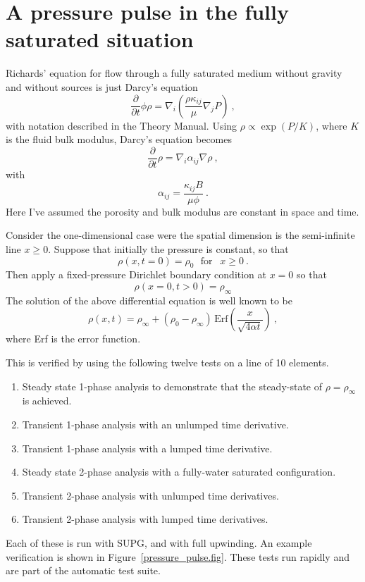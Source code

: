 \documentclass[]{scrreprt}
\begin{document}
\chapter{A pressure pulse in the fully saturated situation}
\label{pp}

Richards' equation for flow through a fully saturated medium without
gravity and without sources is just Darcy's equation
\begin{equation}
\frac{\partial}{\partial t}\phi\rho = \nabla_{i}\left(\frac{\rho
  \kappa_{ij}}{\mu} \nabla_{j}P \right) \ ,
\end{equation}
with notation described in the Theory Manual.  Using $\rho \propto
\exp(P/K)$, where $K$ is the fluid bulk modulus, Darcy's equation
becomes
\begin{equation}
\frac{\partial}{\partial t}\rho = \nabla_{i}\alpha_{ij}\nabla\rho \ ,
\end{equation}
with
\begin{equation}
\alpha_{ij} = \frac{\kappa_{ij}B}{\mu\phi} \ .
\end{equation}
Here I've assumed the porosity and bulk modulus are constant in space
and time.

Consider the one-dimensional case were the spatial dimension is the
semi-infinite line $x\geq 0$.  Suppose that initially the pressure is
constant, so that
\begin{equation}
\rho(x, t=0) = \rho_{0} \ \ \ \mbox{for }\ \ x\geq 0 \ .
\end{equation}
Then apply a fixed-pressure Dirichlet boundary condition at $x=0$ so
that
\begin{equation}
\rho(x=0, t>0) = \rho_{\infty}
\end{equation}
The solution of the above differential equation is well known to be
\begin{equation}
\rho(x, t) = \rho_{\infty} + (\rho_{0} -
\rho_{\infty})\,\mbox{Erf}\left( \frac{x}{\sqrt{4\alpha t}} \right) \ ,
\label{eqn.exact.pp}
\end{equation}
where Erf is the error function.

This is verified by using the following twelve tests on a line of
10 elements.
\begin{enumerate}
\item Steady state 1-phase analysis to demonstrate that the
  steady-state of $\rho = \rho_{\infty}$ is achieved.
\item Transient 1-phase analysis with an unlumped time derivative.
\item Transient 1-phase analysis with a lumped time derivative.
\item Steady state 2-phase analysis with a fully-water saturated configuration.
\item Transient 2-phase analysis with unlumped time derivatives.
\item Transient 2-phase analysis with lumped time derivatives.
\end{enumerate}
Each of these is run with SUPG, and with full upwinding.
An example verification is shown in Figure~\ref{pressure_pulse.fig}.
These tests run rapidly and are part of the automatic test suite.
\end{document}
